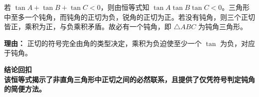 \begin{proofbox}
\begin{description}[style=nextline, leftmargin=2.8em, labelsep=0.5em, itemsep=0.55em]
    \item[\textbf{步骤五（钝角判定）：}] 若 $\tan A+\tan B+\tan C<0$，则由恒等式知 $\tan A\tan B\tan C<0$。三角形中至多一个钝角，而钝角的正切为负，锐角的正切为正。若没有钝角，则三个正切皆正，乘积为正，与负乘积矛盾。故必有一个钝角，即 $\triangle ABC$ 为钝角三角形。
    \par\textbf{理由：}
    正切的符号完全由角的类型决定，乘积为负迫使至少一个 $\tan$ 为负，对应于钝角。
\end{description}

\medskip
\textbf{\textcolor{CProof}{结论回扣}}
\\
\textbf{该恒等式揭示了非直角三角形中正切之间的必然联系，且提供了仅凭符号判定钝角的简便方法。}
\end{proofbox}
